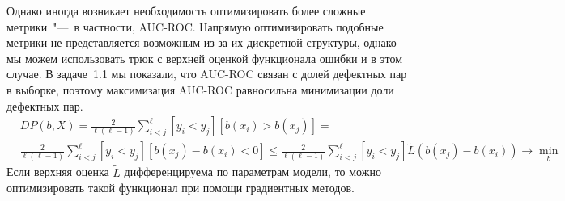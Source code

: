 \documentclass[12pt,a4paper]{article}
\begin{document}
	Однако иногда возникает необходимость оптимизировать более сложные метрики~"---~в частности, AUC-ROC. Напрямую оптимизировать подобные метрики не представляется возможным из-за их дискретной структуры, однако мы можем использовать трюк с верхней оценкой функционала ошибки и в этом случае. В задаче~1.1 мы показали, что AUC-ROC связан с долей дефектных пар в выборке, поэтому максимизация AUC-ROC равносильна минимизации доли дефектных пар.
	\begin{align*}
	&DP(b, X) = \frac{2}{\ell (\ell - 1)}\sum_{i < j}^\ell [y_i < y_j] [b(x_i) > b(x_j)] =\\  &\frac{2}{\ell (\ell - 1)}\sum_{i < j}^\ell  [y_i < y_j] [b(x_j) - b(x_i) < 0] \le \frac{2}{\ell (\ell - 1)}\sum_{i < j}^\ell  [y_i < y_j] \tilde{L}(b(x_j) - b(x_i)) \to \min_b
	\end{align*}
	Если верхняя оценка $\tilde{L}$ дифференцируема по параметрам модели, то можно оптимизировать такой функционал при помощи градиентных методов.
\end{document}
